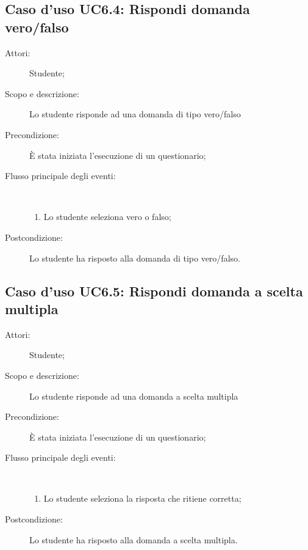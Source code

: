 \subsection{Caso d'uso UC6.4: Rispondi domanda vero/falso}\begin{description}
\item[Attori:] Studente;
\item[Scopo e descrizione:] Lo studente risponde ad una domanda di tipo vero/falso
      \item[Precondizione:] È stata iniziata l'esecuzione di un questionario;

        \item[Flusso principale degli eventi:] \ 
 \begin{enumerate}
          \item Lo studente seleziona vero o falso;

      \end{enumerate}
    \item[Postcondizione:] Lo studente ha risposto alla domanda di tipo vero/falso.
  \end{description}
\hypertarget{UC6.5}{}
\subsection{Caso d'uso UC6.5: Rispondi domanda a scelta multipla}\begin{description}
\item[Attori:] Studente;
\item[Scopo e descrizione:] Lo studente risponde ad una domanda a scelta multipla
      \item[Precondizione:] È stata iniziata l'esecuzione di un questionario;

        \item[Flusso principale degli eventi:] \ 
 \begin{enumerate}
          \item Lo studente seleziona la risposta che ritiene corretta;

      \end{enumerate}
    \item[Postcondizione:] Lo studente ha risposto alla domanda a scelta multipla.
  \end{description}
\hypertarget{UC6.6}{}
